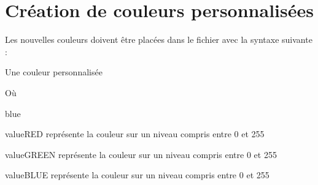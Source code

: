 \section{Création de couleurs personnalisées}

Les nouvelles couleurs doivent être placées dans le fichier  avec la syntaxe suivante : 

\begin{Latex}{Une couleur personnalisée}
\end{Latex}

Où 
\begin{items}{blue}{\Bullet}
    \item valueRED représente la couleur  sur un niveau compris entre 0 et 255
    \item valueGREEN représente la couleur  sur un niveau compris entre 0 et 255
    \item valueBLUE représente la couleur   sur un niveau compris entre 0 et 255
\end{items}


